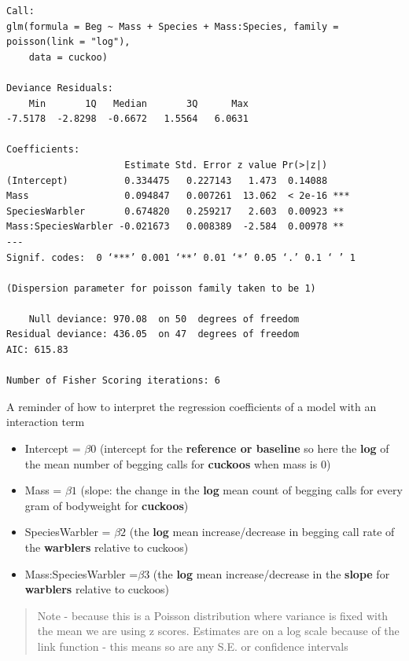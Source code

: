 \documentclass[
]{book}
\begin{document}
\begin{verbatim}
Call:
glm(formula = Beg ~ Mass + Species + Mass:Species, family = poisson(link = "log"), 
    data = cuckoo)

Deviance Residuals: 
    Min       1Q   Median       3Q      Max  
-7.5178  -2.8298  -0.6672   1.5564   6.0631  

Coefficients:
                     Estimate Std. Error z value Pr(>|z|)    
(Intercept)          0.334475   0.227143   1.473  0.14088    
Mass                 0.094847   0.007261  13.062  < 2e-16 ***
SpeciesWarbler       0.674820   0.259217   2.603  0.00923 ** 
Mass:SpeciesWarbler -0.021673   0.008389  -2.584  0.00978 ** 
---
Signif. codes:  0 ‘***’ 0.001 ‘**’ 0.01 ‘*’ 0.05 ‘.’ 0.1 ‘ ’ 1

(Dispersion parameter for poisson family taken to be 1)

    Null deviance: 970.08  on 50  degrees of freedom
Residual deviance: 436.05  on 47  degrees of freedom
AIC: 615.83

Number of Fisher Scoring iterations: 6
\end{verbatim}

A reminder of how to interpret the regression coefficients of a model with an interaction term

\begin{itemize}
\item
  Intercept = \(\beta 0\) (intercept for the \textbf{reference or baseline} so here the \textbf{log} of the mean number of begging calls for \textbf{cuckoos} when mass is 0)
\item
  Mass = \(\beta1\) (slope: the change in the \textbf{log} mean count of begging calls for every gram of bodyweight for \textbf{cuckoos})
\item
  SpeciesWarbler = \(\beta2\) (the \textbf{log} mean increase/decrease in begging call rate of the \textbf{warblers} relative to cuckoos)
\item
  Mass:SpeciesWarbler =\(\beta3\) (the \textbf{log} mean increase/decrease in the \textbf{slope} for \textbf{warblers} relative to cuckoos)
\end{itemize}

\begin{quote}
Note - because this is a Poisson distribution where variance is fixed with the mean we are using z scores. Estimates are on a log scale because of the link function - this means so are any S.E. or confidence intervals
\end{quote}
\end{document}
